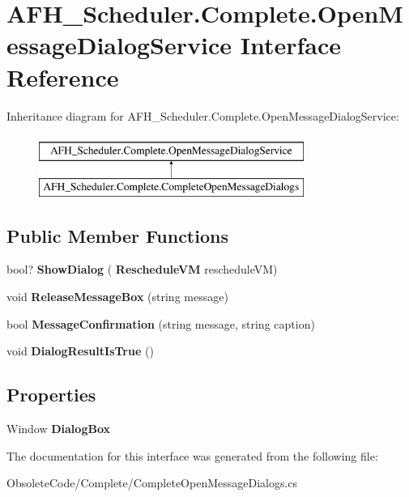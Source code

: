 \section{A\+F\+H\+\_\+\+Scheduler.\+Complete.\+Open\+Message\+Dialog\+Service Interface Reference}
\label{interface_a_f_h___scheduler_1_1_complete_1_1_open_message_dialog_service}
Inheritance diagram for A\+F\+H\+\_\+\+Scheduler.\+Complete.\+Open\+Message\+Dialog\+Service\+:\begin{figure}[H]
\begin{center}
\leavevmode
\includegraphics[height=2.000000cm]{interface_a_f_h___scheduler_1_1_complete_1_1_open_message_dialog_service}
\end{center}
\end{figure}
\subsection*{Public Member Functions}
\begin{DoxyCompactItemize}
\item 
\mbox{\label{interface_a_f_h___scheduler_1_1_complete_1_1_open_message_dialog_service_ab034d0222ad94199a81be8b4e26865b3}} 
bool? {\bfseries Show\+Dialog} (\textbf{ Reschedule\+VM} reschedule\+VM)
\item 
\mbox{\label{interface_a_f_h___scheduler_1_1_complete_1_1_open_message_dialog_service_a7c324380b6f465f176f22628cef43d26}} 
void {\bfseries Release\+Message\+Box} (string message)
\item 
\mbox{\label{interface_a_f_h___scheduler_1_1_complete_1_1_open_message_dialog_service_a8512217683e3495fc15fe0f5572e9fb8}} 
bool {\bfseries Message\+Confirmation} (string message, string caption)
\item 
\mbox{\label{interface_a_f_h___scheduler_1_1_complete_1_1_open_message_dialog_service_ae7633b312b1ace5c291577a26bfadb7f}} 
void {\bfseries Dialog\+Result\+Is\+True} ()
\end{DoxyCompactItemize}
\subsection*{Properties}
\begin{DoxyCompactItemize}
\item 
\mbox{\label{interface_a_f_h___scheduler_1_1_complete_1_1_open_message_dialog_service_afa0bc28b4c4186294e6ec31e687823fd}} 
Window {\bfseries Dialog\+Box}\hspace{0.3cm}{\ttfamily  [get, set]}
\end{DoxyCompactItemize}


The documentation for this interface was generated from the following file\+:\begin{DoxyCompactItemize}
\item 
Obsolete\+Code/\+Complete/Complete\+Open\+Message\+Dialogs.\+cs\end{DoxyCompactItemize}
